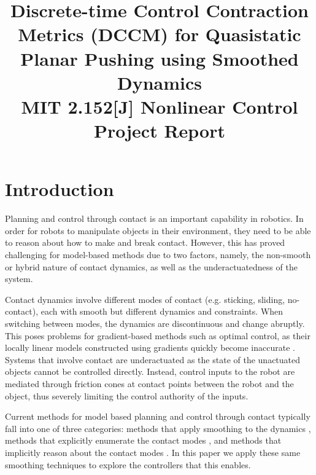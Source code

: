 \documentclass[journal]{IEEEtran}
\begin{document}
\title{Discrete-time Control Contraction Metrics (DCCM) for Quasistatic Planar Pushing using Smoothed Dynamics\\
{\footnotesize MIT 2.152[J] Nonlinear Control Project Report}
}

\author{
}

\maketitle

\begin{abstract}

\end{abstract}

\section{Introduction}
Planning and control through contact is an important capability in robotics. In order for robots to manipulate objects in their environment, they need to be able to reason about how to make and break contact. However, this has proved challenging for model-based methods due to two factors, namely, the non-smooth or hybrid nature of contact dynamics, as well as the underactuatedness of the system.

Contact dynamics involve different modes of contact (e.g. sticking, sliding, no-contact), each with smooth but different dynamics and constraints. When switching between modes, the dynamics are discontinuous and change abruptly. This poses problems for gradient-based methods such as optimal control, as their locally linear models constructed using gradients quickly become inaccurate \autocite{pangGlobalPlanningContactRich2023}.
Systems that involve contact are underactuated as the state of the unactuated objects cannot be controlled directly. Instead, control inputs to the robot are mediated through friction cones at contact points between the robot and the object, thus severely limiting the control authority of the inputs.

Current methods for model based planning and control through contact typically fall into one of three categories: methods that apply smoothing to the dynamics \autocite{stewartOptimalControlSystems2010,pangGlobalPlanningContactRich2023}, methods that explicitly enumerate the contact modes \autocite{hoganFeedbackControlPusherSlider2016}, and methods that implicitly reason about the contact modes \autocite{sleimanContactImplicitTrajectoryOptimization2019,nakatsuruImplicitContactRichManipulation2023,posaDirectMethodTrajectory2014}. In this paper we apply these same smoothing techniques to explore the controllers that this enables.
\end{document}
